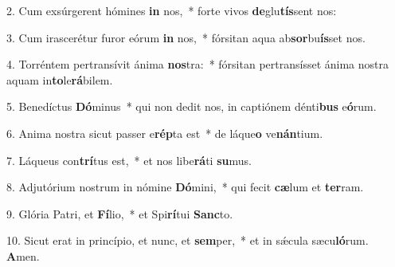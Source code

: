 2. Cum exsúrgerent hómines \textbf{in} nos,~*  forte vivos \textbf{de}glu\textbf{tís}sent nos:\

3. Cum irascerétur furor eórum \textbf{in} nos,~*  fórsitan aqua ab\textbf{sor}bu\textbf{ís}set nos.\

4. Torréntem pertransívit ánima \textbf{nos}tra:~*  fórsitan pertransísset ánima nostra aquam in\textbf{to}le\textbf{rá}bilem.\

5. Benedíctus \textbf{Dó}minus~*  qui non dedit nos, in captiónem dénti\textbf{bus} e\textbf{ó}rum.\

6. Anima nostra sicut passer e\textbf{rép}ta est~*  de láque\textbf{o} ve\textbf{nán}tium.\

7. Láqueus con\textbf{trí}tus est,~*  et nos libe\textbf{rá}ti \textbf{su}mus.\

8. Adjutórium nostrum in nómine \textbf{Dó}mini,~*  qui fecit \textbf{cæ}lum et \textbf{ter}ram.\

9. Glória Patri, et \textbf{Fí}lio,~*  et Spi\textbf{rí}tui \textbf{Sanc}to.\

10. Sicut erat in princípio, et nunc, et \textbf{sem}per,~*  et in sǽcula sæcu\textbf{ló}rum. \textbf{A}men.\

